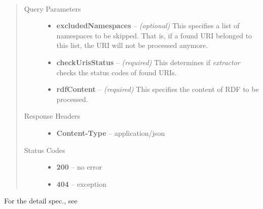 \documentclass[letterpaper,10pt,english]{sphinxmanual}
\begin{document}
\begin{fulllineitems}
\label{api_ref:post--extractor_?excludedNamespaces, checkUrisStatus, rdfContent_}~\begin{quote}\begin{description}
\item[{Query Parameters}] \leavevmode\begin{itemize}
\item {} 
\textbf{excludedNamespaces} -- \emph{(optional)} This specifies a list of namespaces to be skipped. That is, if a found URI belonged to this list, the URI will not be processed anymore.

\item {} 
\textbf{checkUrisStatus} -- \emph{(required)} This determines if \emph{extractor} checks the status codes of found URIs.

\item {} 
\textbf{rdfContent} -- \emph{(required)} This specifies the content of RDF to be processed.

\end{itemize}

\item[{Response Headers}] \leavevmode\begin{itemize}
\item {} 
\textbf{Content-Type} -- application/json

\end{itemize}

\item[{Status Codes}] \leavevmode\begin{itemize}
\item {} 
\textbf{200} -- no error

\item {} 
\textbf{404} -- exception

\end{itemize}

\end{description}\end{quote}

\end{fulllineitems}


For the detail spec., see 
\end{document}
